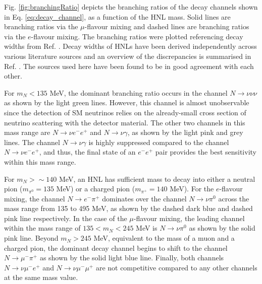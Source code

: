 
Fig. \ref{fig:branchingRatio} depicts the branching ratios of the decay channels shown in Eq. \ref{eq:decay_channel}, as a function of the HNL mass.
Solid lines are branching ratios via the $\mu$-flavour mixing and dashed lines are branching ratios via the $e$-flavour mixing.
The branching ratios were plotted referencing decay widths from Ref. \cite {HNLBin, SBNHNL, HNLZarko}.
Decay widths of HNLs have been derived independently across various literature sources and an overview of the discrepancies is summarised in Ref. \cite{HNLZarko}. 
The sources used here have been found to be in good agreement with each other.

For $m_{N} < 135$ MeV, the dominant branching ratio occurs in the channel $N\rightarrow \nu\nu\nu$ as shown by the light green lines.
However, this channel is almost unobservable since the detection of SM neutrinos relies on the already-small cross section of neutrino scattering with the detector material.
The other two channels in this mass range are $N\rightarrow \nu e^{-}e^{+}$ and $N\rightarrow \nu \gamma$, as shown by the light pink and grey lines.
The channel $N\rightarrow \nu \gamma$ is highly suppressed compared to the channel $N\rightarrow \nu e^{-}e^{+}$, and thus, the final state of an $e^-e^+$ pair provides the best sensitivity within this mass range.

For $m_{N} > \sim140$ MeV, an HNL has sufficient mass to decay into either a neutral pion ($m_{\pi^{0}}=135$ MeV) or a charged pion ($m_{\pi^{+}}=140$ MeV). 
For the $e$-flavour mixing, the channel $N\rightarrow e^{-}\pi^{+}$ dominates over the channel $N\rightarrow \nu \pi^{0}$ across the mass range from 135 to 495 MeV, as shown by the dashed dark blue and dashed pink line respectively.
In the case of the $\mu$-flavour mixing, the leading channel within the mass range of $135 < m_{N} < 245 $ MeV is $N\rightarrow \nu \pi^{0}$ as shown by the solid pink line.
Beyond $m_{N} > 245$ MeV, equivalent to the mass of a muon and a charged pion, the dominant decay channel begins to shift to the channel $N\rightarrow \mu^{-}\pi^{+}$ as shown by the solid light blue line.
Finally, both channels $N\rightarrow \nu \mu^{-}e^{+}$ and $N\rightarrow \nu \mu^{-}\mu^{+}$ are not competitive compared to any other channels at the same mass value.  

